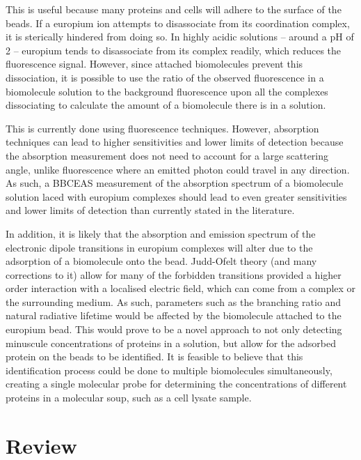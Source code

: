This is useful because many proteins and cells will adhere to the surface of
the beads. If a europium ion attempts to disassociate from its coordination
complex, it is sterically hindered from doing so. In highly acidic solutions
-- around a pH of 2 -- europium tends to disassociate from its complex
readily, which reduces the fluorescence signal. However, since attached
biomolecules prevent this dissociation, it is possible to use the ratio of the
observed fluorescence in a biomolecule solution to the background fluorescence
upon all the complexes dissociating to calculate the amount of a biomolecule
there is in a solution.

This is currently done using fluorescence techniques. However, absorption
techniques can lead to higher sensitivities and lower limits of detection
because the absorption measurement does not need to account for a large
scattering angle, unlike fluorescence where an emitted photon could travel in
any direction. As such, a \ac{BBCEAS} measurement of the
absorption spectrum of a biomolecule solution laced with europium complexes
should lead to even greater sensitivities and lower limits of detection than
currently stated in the literature.

In addition, it is likely that the absorption and emission spectrum of the
electronic dipole transitions in europium complexes will alter due to the
adsorption of a biomolecule onto the bead. Judd-Ofelt theory (and many
corrections to it) allow for many of the forbidden transitions provided a
higher order interaction with a localised electric field, which can come from
a complex or the surrounding medium. As such, parameters such as the branching
ratio and natural radiative lifetime would be affected by the biomolecule
attached to the europium bead. This would prove to be a novel approach to
not only detecting minuscule concentrations of proteins in a solution,
but allow for the adsorbed protein on the beads to be identified. It is
feasible to believe that this identification process could be done to multiple
biomolecules simultaneously, creating a single molecular probe for determining
the concentrations of different proteins in a molecular soup, such as a cell
lysate sample.


\section{Review}
